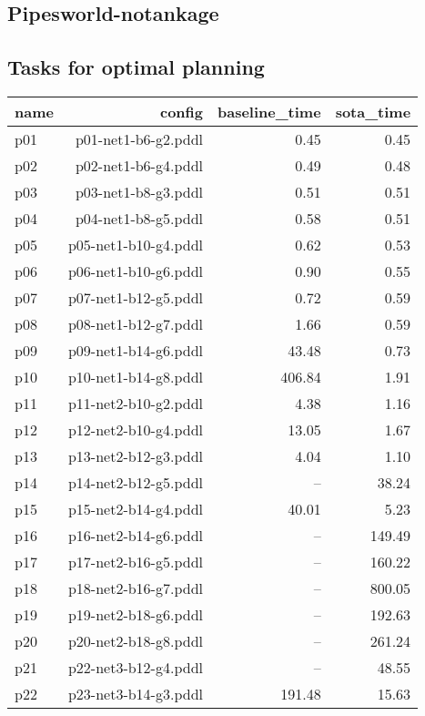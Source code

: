 \documentclass{article}
\begin{document}
                \newpage \subsection{Pipesworld-notankage}
                    \subsection*{Tasks for optimal planning}
                    
                            \begin{center}
                            \scriptsize
                            \begin{tabular}{@{}l|r|r|r@{}}
                            name & config & baseline\_time & sota\_time\\\midrule
                              p01& p01-net1-b6-g2.pddl&0.45&0.45\\
  p02& p02-net1-b6-g4.pddl&0.49&0.48\\
  p03& p03-net1-b8-g3.pddl&0.51&0.51\\
  p04& p04-net1-b8-g5.pddl&0.58&0.51\\
  p05& p05-net1-b10-g4.pddl&0.62&0.53\\
  p06& p06-net1-b10-g6.pddl&0.90&0.55\\
  p07& p07-net1-b12-g5.pddl&0.72&0.59\\
  p08& p08-net1-b12-g7.pddl&1.66&0.59\\
  p09& p09-net1-b14-g6.pddl&43.48&0.73\\
  p10& p10-net1-b14-g8.pddl&406.84&1.91\\
  p11& p11-net2-b10-g2.pddl&4.38&1.16\\
  p12& p12-net2-b10-g4.pddl&13.05&1.67\\
  p13& p13-net2-b12-g3.pddl&4.04&1.10\\
  p14& p14-net2-b12-g5.pddl&--&38.24\\
  p15& p15-net2-b14-g4.pddl&40.01&5.23\\
  p16& p16-net2-b14-g6.pddl&--&149.49\\
  p17& p17-net2-b16-g5.pddl&--&160.22\\
  p18& p18-net2-b16-g7.pddl&--&800.05\\
  p19& p19-net2-b18-g6.pddl&--&192.63\\
  p20& p20-net2-b18-g8.pddl&--&261.24\\
  p21& p22-net3-b12-g4.pddl&--&48.55\\
  p22& p23-net3-b14-g3.pddl&191.48&15.63\\

\end{tabular}
\end{center}
\end{document}
